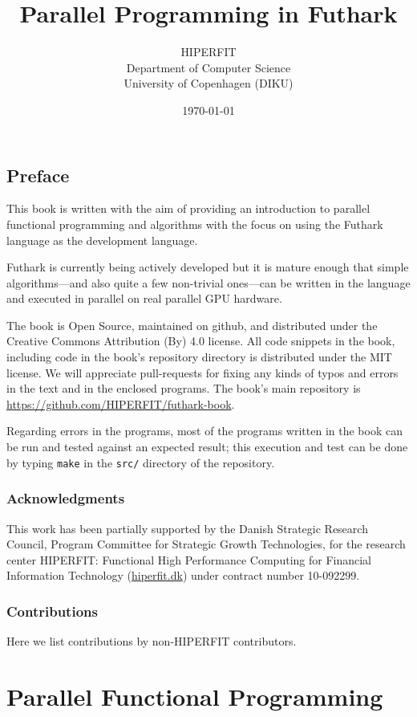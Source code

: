 \documentclass[oneside,11pt]{book}
\title{\bf Parallel Programming in Futhark}
\author{HIPERFIT \\ Department of Computer Science \\ University of Copenhagen (DIKU)}
\date{\today}
\begin{document}
\frontmatter
\maketitle
\chapter{Preface}

This book is written with the aim of providing an introduction to
parallel functional programming and algorithms with the focus on using
the Futhark language as the development language.

Futhark is currently being actively developed but it is mature enough
that simple algorithms---and also quite a few non-trivial ones---can
be written in the language and executed in parallel on real parallel
GPU hardware.

The book is Open Source, maintained on github, and distributed under
the Creative Commons Attribution (By) 4.0 license. All code snippets
in the book, including code in the book's repository directory is
distributed under the MIT license. We will appreciate pull-requests
for fixing any kinds of typos and errors in the text and in the
enclosed programs. The book's main repository is \url{https://github.com/HIPERFIT/futhark-book}.

Regarding errors in the programs, most of the
programs written in the book can be run and tested against an expected
result; this execution and test can be done by typing \texttt{make} in
the \texttt{src/} directory of the repository.

\section*{Acknowledgments}
This work has been partially supported by the Danish Strategic Research
Council, Program Committee for Strategic Growth Technologies, for the
research center HIPERFIT: Functional High Performance Computing for
Financial Information Technology (\url{hiperfit.dk}) under contract number
10-092299.

\section*{Contributions}
Here we list contributions by non-HIPERFIT contributors.


\tableofcontents
\mainmatter
\part{Parallel Functional Programming}
\end{document}
